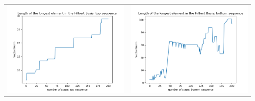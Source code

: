 \documentclass[10pt]{article}
\begin{document}
\begin{tabular}{c|c}
\begin{minipage}{.45\textwidth}
\includegraphics[width=\textwidth]{"DATA/5d/6 generators 2 bound E/top_sequence LENGTH"}
\end{minipage} &
\begin{minipage}{.45\textwidth}
\includegraphics[width=\textwidth]{"DATA/5d/6 generators 2 bound E bottomup/bottom_sequence LENGTH"}
\end{minipage}
\end{tabular}
\end{document}
